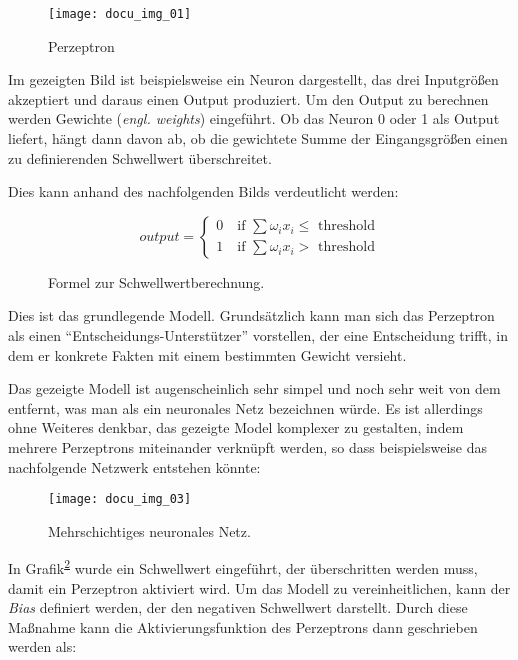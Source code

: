 \begin{figure}[h]
    \centering
    \texttt{[image: docu\_img\_01]}
    \caption{Perzeptron}
    \label{fig:perzeptron}
\end{figure}

Im gezeigten Bild ist beispielsweise ein Neuron dargestellt, das drei Inputgrößen akzeptiert und daraus einen Output
produziert. Um den Output zu berechnen werden Gewichte (\textit{engl. weights}) eingeführt. Ob das Neuron 0 oder 1 als
Output liefert, hängt dann davon ab, ob die gewichtete Summe der Eingangsgrößen einen zu definierenden Schwellwert
überschreitet.

Dies kann anhand des nachfolgenden Bilds verdeutlicht werden:

\begin{figure}[h]
    \centering
    \[ output =
      \begin{cases}
        0 \quad \text{if } \sum \omega_i x_i \leqslant \text{ threshold}\\
        1 \quad \text{if } \sum \omega_i x_i > \text{ threshold}
      \end{cases}
    \]
    \caption{Formel zur Schwellwertberechnung.}
    \label{fig:neuron-three-way}
\end{figure}


Dies ist das grundlegende Modell. Grundsätzlich kann man sich das Perzeptron als einen ``Entscheidungs-Unterstützer''
vorstellen, der eine Entscheidung trifft, in dem er konkrete Fakten mit einem bestimmten Gewicht versieht.

Das gezeigte Modell ist augenscheinlich sehr simpel und noch sehr weit von dem entfernt, was man als ein neuronales
Netz bezeichnen würde. Es ist allerdings ohne Weiteres denkbar, das gezeigte Model komplexer zu gestalten, indem
mehrere Perzeptrons miteinander verknüpft werden, so dass beispielsweise das nachfolgende Netzwerk entstehen könnte:

\begin{figure}[h]
    \centering
    \texttt{[image: docu\_img\_03]}
    \caption{Mehrschichtiges neuronales Netz.}
    \label{fig:multi-layer-net}
\end{figure}



In Grafik\textsuperscript{\ref{fig:neuron-three-way}} wurde ein Schwellwert eingeführt, der überschritten werden muss, damit ein Perzeptron
aktiviert wird. Um das Modell zu vereinheitlichen, kann der \textit{Bias} definiert werden, der den
negativen Schwellwert darstellt. Durch diese Maßnahme kann die Aktivierungsfunktion des Perzeptrons dann geschrieben
werden als:

